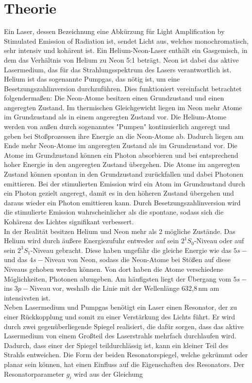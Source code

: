 \section{Theorie}
\label{sec:Theorie}


    Ein Laser, dessen Bezeichnung eine Abkürzung für Light Amplification by Stimulated Emission of Radiation ist,
    sendet Licht aus, welches monochromatisch, sehr intensiv und kohärent ist.
    Ein Helium-Neon-Laser enthält ein Gasgemisch, in dem das Verhältnis von Helium zu Neon 5:1 beträgt.
    Neon ist dabei das aktive Lasermedium, das für das Strahlungsspektrum des Lasers verantwortlich ist.
    Helium ist das sogenannte Pumpgas, das nötig ist, um eine Besetzungszahlinversion durchzuführen.
    Dies funktioniert vereinfacht betrachtet folgendermaßen:
    Die Neon-Atome besitzen einen Grundzustand und einen angeregten Zustand.
    Im thermischen Gleichgewicht liegen im Neon mehr Atome im Grundzustand als in einem angeregten Zustand vor.
    Die Helium-Atome werden von außen durch sogenanntes "Pumpen" kontinuierlich angeregt
    und geben bei Stoßprozessen ihre Energie an die Neon-Atome ab.
    Dadurch liegen am Ende mehr Neon-Atome im angeregten Zustand als im Grundzustand vor.
    Die Atome im Grundzustand können ein Photon absorbieren und bei entsprechend hoher Energie
    in den angeregten Zustand übergehen. Die Atome im angeregten Zustand können spontan in den Grundzustand zurückfallen
    und dabei Photonen emittieren.
    Bei der stimulierten Emission wird ein Atom im Grundzustand durch ein Photon gezielt angeregt, damit
    es in den höheren Zustand übergehen und daraus wieder ein Photon emittieren kann.
    Durch Besetzungszahlinversion wird die stimulierte Emission wahrscheinlicher als die spontane,
    sodass sich die Kohärenz des Lichtes signifikant verbessert.\\
    In der Realität besitzen Helium und Neon mehr als 2 mögliche Zustände.
    Das Helium wird durch äußere Energiezufuhr entweder auf sein $2^1S_0$-Niveau oder auf sein $2^3S_1$-Niveau
    gebracht. Diese haben ungefähr die gleiche Energie wie das $5s-$ und das $4s-$Niveau von Neon,
    sodass die Neon-Atome bei Stößen auf diese Niveaus gehoben werden können. Von dort haben die
    Atome verschiedene Möglichkeiten, Photonen abzugeben. Am häufigsten liegt der Übergang vom $5s-$ ins $3p-$Niveau
    vor, weshalb die Linie mit der Wellenlänge 632,8\,nm am intensivsten ist. \\

    Neben Lasermedium und Pumpgas benötigt ein Laser einen Resonator, der zu einer Rückkopplung und somit
    zu einer Verstärkung des Lichts führt. Er wird durch zwei gegenüberliegende Spiegel realisiert, die
    dafür sorgen, dass das aktive Lasermedium von einem Großteil des Laserstrahls mehrfach durchlaufen wird.
    Dadurch, dass einer der Spiegel teildurchlässig ist, kann ein kleiner Teil des Strahls entweichen.
    Die Form der beiden Resonatorspiegel, welche gekrümmt oder planar sein können,
    hat einen Einfluss auf die Eigenschaften des Resonators.
    Der Resonatorparameter $g_i$ wird aus der Gleichung

